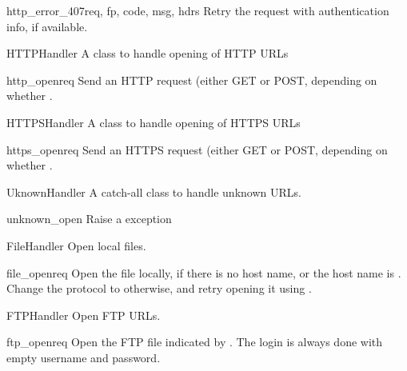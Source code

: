 \begin{methoddesc}[ProxyDigestAuthHandler]{http_error_407}{req, fp, code, 
                                                        msg, hdrs}
Retry the request with authentication info, if available.
\end{methoddesc}

\begin{classdesc}{HTTPHandler}{}
A class to handle opening of HTTP URLs
\end{classdesc}

\begin{methoddesc}[HTTPHandler]{http_open}{req}
Send an HTTP request (either GET or POST, depending on whether
.
\end{methoddesc}

\begin{classdesc}{HTTPSHandler}{}
A class to handle opening of HTTPS URLs
\end{classdesc}

\begin{methoddesc}[HTTPSHandler]{https_open}{req}
Send an HTTPS request (either GET or POST, depending on whether
.
\end{methoddesc}

\begin{classdesc}{UknownHandler}{}
A catch-all class to handle unknown URLs.
\end{classdesc}

\begin{methoddesc}[UknownHandler]{unknown_open}
Raise a  exception
\end{methoddesc}

\begin{classdesc}{FileHandler}{}
Open local files.
\end{classdesc}

\begin{methoddesc}[FileHandler]{file_open}{req}
Open the file locally, if there is no host name, or
the host name is . Change the
protocol to  otherwise, and retry opening
it using .
\end{methoddesc}

\begin{classdesc}{FTPHandler}{}
Open FTP URLs.
\end{classdesc}

\begin{methoddesc}[FTPHandler]{ftp_open}{req}
Open the FTP file indicated by .
The login is always done with empty username and password.
\end{methoddesc}

